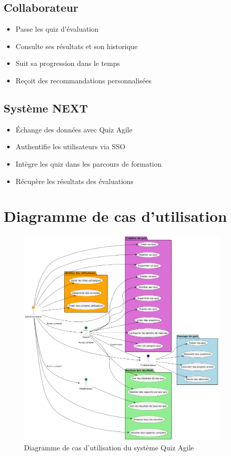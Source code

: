 \documentclass[12pt,a4paper]{report}
\begin{document}
\subsection{Collaborateur}

\begin{itemize}
\item Passe les quiz d'évaluation
\item Consulte ses résultats et son historique
\item Suit sa progression dans le temps
\item Reçoit des recommandations personnalisées
\end{itemize}

\subsection{Système NEXT}

\begin{itemize}
\item Échange des données avec Quiz Agile
\item Authentifie les utilisateurs via SSO
\item Intègre les quiz dans les parcours de formation
\item Récupère les résultats des évaluations
\end{itemize}

\section{Diagramme de cas d'utilisation}

\begin{figure}[htbp]
    \centering
    \includegraphics[width=0.9\textwidth]{latex_media/media/image14.png}
    \caption{Diagramme de cas d'utilisation du système Quiz Agile}
    \label{fig:cas-utilisation-systeme}
\end{figure}
\end{document}
